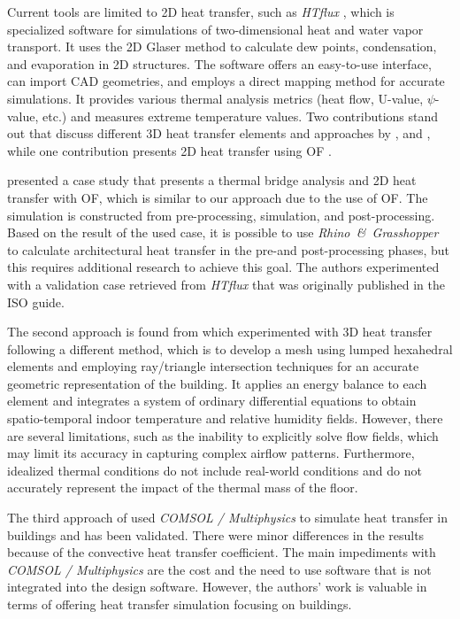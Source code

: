 Current tools are limited to 2D heat transfer, such as \textit{HTflux} \cite{HTflux}, which is specialized software for simulations of two-dimensional heat and water vapor transport.
It uses the 2D Glaser method \cite{glaser1959graphisches} to calculate dew points, condensation, and evaporation in 2D structures. 
The software offers an easy-to-use interface, can import \gls{CAD} geometries, and employs a direct mapping method for accurate simulations. 
It provides various thermal analysis metrics (heat flow, U-value, $\psi$-value, etc.) and measures extreme temperature values. Two contributions stand out that discuss different 3D heat transfer elements and approaches by  \citeauthor{Yang} \cite{Yang}, and \citeauthor{COMSOL} \cite{COMSOL}, while one contribution presents 2D heat transfer using \gls{OF} \cite{kastner2020solving}.

\citeauthor{kastner2020solving} \cite{kastner2020solving} presented a case study that presents a thermal bridge analysis and 2D heat transfer with \gls{OF}, which is similar to our approach due to the use of \gls{OF}. The simulation is constructed from pre-processing, simulation, and post-processing. 
Based on the result of the used case, it is possible to use \textit{Rhino\ \&\ Grasshopper} to calculate architectural heat transfer in the pre-and post-processing phases, but this requires additional research to achieve this goal. 
The authors experimented with a validation case retrieved from \textit{HTflux} that was originally published in the ISO guide. 

The second approach is found from \citeauthor{Yang} \cite{Yang} which experimented with 3D heat transfer following a different method, which is to develop a mesh using lumped hexahedral elements and employing ray/triangle intersection techniques for an accurate geometric representation of the building. 
It applies an energy balance to each element and integrates a system of ordinary differential equations to obtain spatio-temporal indoor temperature and relative humidity fields. 
However, there are several limitations, such as the inability to explicitly solve flow fields, which may limit its accuracy in capturing complex airflow patterns. 
Furthermore, idealized thermal conditions do not include real-world conditions and do not accurately represent the impact of the thermal mass of the floor. 


The third approach of \citeauthor{COMSOL} \cite{COMSOL} used \textit{COMSOL / Multiphysics} to simulate heat transfer in buildings and has been validated. There were minor differences in the results because of the convective heat transfer coefficient. 
The main impediments with \textit{COMSOL / Multiphysics} are the cost and the need to use software that is not integrated into the design software.
However, the authors' work is valuable in terms of offering heat transfer simulation focusing on buildings.  %

